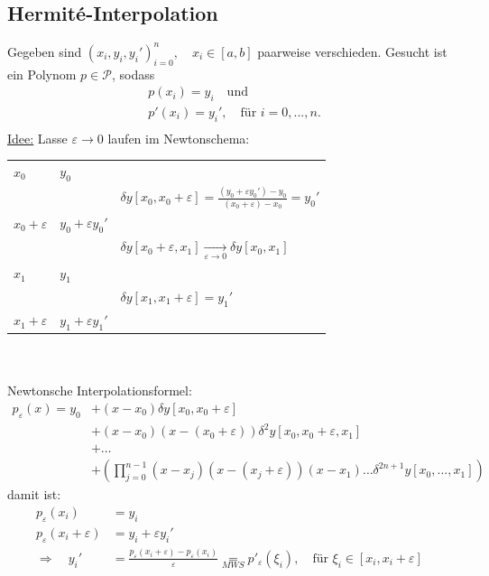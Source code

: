 \documentclass[12pt]{article}
\theoremstyle{break}
\begin{document}
\subsection{Hermit\'{e}-Interpolation}

Gegeben sind $(x_i, y_i, y_i')_{i=0}^n, \quad x_i \in [a,b]$ paarweise verschieden. Gesucht ist ein Polynom $p \in \mathcal{P}$, sodass
\begin{align*}
&p(x_i) = y_i \quad \text{und } &\\
&p'(x_i) = y_i', \quad \text{für } i=0,...,n. &\\
\end{align*}
\underline{Idee:} Lasse $\varepsilon \rightarrow 0$ laufen im Newtonschema:

\begin{tabular}{lll}
 
$x_0$ & $y_0$\\
 & & $\delta y[x_0, x_0+\varepsilon] = \frac{(y_0 + \varepsilon y_0') - y_0}{(x_0 +\varepsilon) - x_0} = y_0'$\\
$x_0+\varepsilon$ & $y_0 + \varepsilon y_0'$\\
 & & $\delta y[x_0+\varepsilon, x_1] \underset{\varepsilon \rightarrow 0}{\rightarrow} \delta y[x_0,x_1]$\\
$x_1$ & $y_1$\\
 & & $\delta y[x_1, x_1+\varepsilon] = y_1'$\\
$x_1+\varepsilon$ & $y_1+\varepsilon y_1'$\\
 
\end{tabular} \\ \\
Newtonsche Interpolationsformel:
\begin{align*}
p_{\varepsilon}(x) = y_0 &+ (x-x_0) \delta y[x_0, x_0+\varepsilon] &\\
&+ (x-x_0)(x-(x_0 + \varepsilon)) \delta^2y[x_0, x_0 + \varepsilon, x_1] &\\
&+ \dots &\\
&+ \left( \prod_{j=0}^{n-1} (x-x_j)(x-(x_j + \varepsilon))(x-x_1) \dots \delta^{2n+1} y[x_0,\dots, x_1]\right)
\end{align*}
damit ist:
\begin{align*}
p_{\varepsilon}(x_i) &= y_i &\\
p_{\varepsilon}(x_i + \varepsilon) &= y_i + \varepsilon y_i' &\\
\Rightarrow \quad y_i' &= \frac{p_{\varepsilon}(x_i + \varepsilon) - p_{\varepsilon}(x_i)}{\varepsilon} \underset{MWS}{=} p'_{\varepsilon}(\xi_i), \quad \text{für } \xi_i \in [x_i, x_i+\varepsilon]
\end{align*}
\end{document}
